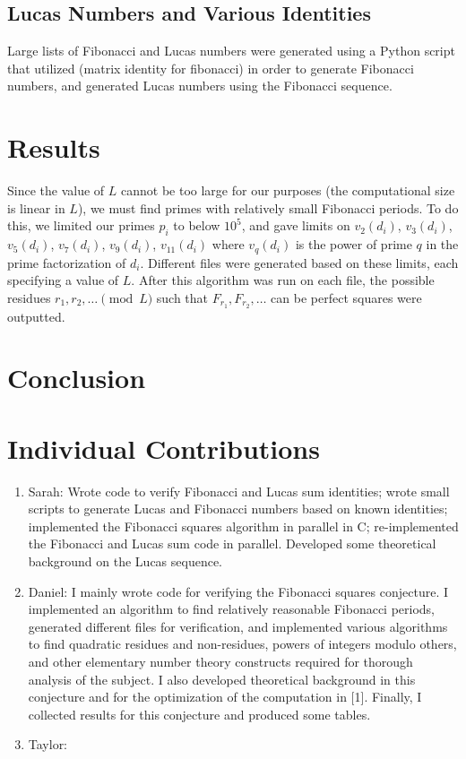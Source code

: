 \documentclass[11pt]{article}
\begin{document}
\subsection{Lucas Numbers and Various Identities}
Large lists of Fibonacci and Lucas numbers were generated using a Python script that utilized (matrix identity for fibonacci) in order to generate Fibonacci numbers, and generated Lucas numbers using the Fibonacci sequence. 


\section{Results}

Since the value of $L$ cannot be too large for our purposes (the computational size is linear in $L$), we must find primes with relatively small Fibonacci periods. To do this, we limited our primes $p_i$ to below $10^5$, and gave limits on $v_2(d_i)$, $v_3(d_i)$, $v_5(d_i)$, $v_7(d_i)$, $v_9(d_i)$, $v_{11}(d_i)$ where $v_q(d_i)$ is the power of prime $q$ in the prime factorization of $d_i$. Different files were generated based on these limits, each specifying a value of $L$. After this algorithm was run on each file, the possible residues $r_1, r_2, \dots \pmod L$ such that $F_{r_1}, F_{r_2}, \dots$ can be perfect squares were outputted.

\section{Conclusion}



\section{Individual Contributions}

\begin{enumerate}
\item Sarah: Wrote code to verify Fibonacci and Lucas sum identities; wrote small scripts to generate Lucas and Fibonacci numbers based on known identities; implemented the Fibonacci squares algorithm in parallel in C; re-implemented the Fibonacci and Lucas sum code in parallel. Developed some theoretical background on the Lucas sequence.

\item Daniel: I mainly wrote code for verifying the Fibonacci squares conjecture. I implemented an algorithm to find relatively reasonable Fibonacci periods, generated different files for verification, and implemented various algorithms to find quadratic residues and non-residues, powers of integers modulo others, and other elementary number theory constructs required for thorough analysis of the subject. I also developed theoretical background in this conjecture and for the optimization of the computation in [1]. Finally, I collected results for this conjecture and produced some tables.

\item Taylor:
\end{enumerate}
\end{document}
